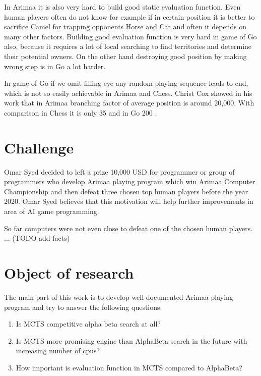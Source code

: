 In Arimaa it is also very hard to build good static evaluation function. Even
human players often do not know for example if in certain position it is better
to sacrifice Camel for trapping opponents Horse and Cat and often it depends on
many other factors. Building good evaluation function is very hard in game of
Go also, because it requires a lot of local searching to find territories and
determine their potential owners. On the other hand destroying good position by
making wrong step is in Go a lot harder.

In game of Go if we omit filling eye any random playing sequence leads to end,
which is not so easily achievable in Arimaa and Chess. Christ Cox showed in his
work that in Arimaa branching factor of average position is around 20,000. With
comparison in Chess it is only 35 and in Go 200 \cite{COX}.


\section{Challenge}
Omar Syed decided to left a prize 10,000 USD for programmer or group of
programmers who develop Arimaa playing program which win Arimaa Computer
Championship and then defeat three chosen top human players before the year
2020. Omar Syed believes that this motivation will help further improvements in
area of AI game programming\cite{syed}.

So far computers were not even close to defeat one of the chosen human
players\cite{arimaa.com}. ... (TODO add facts)

\section{Object of research}
The main part of this work is to develop well documented Arimaa playing program
and try to answer the following questions:

\begin{enumerate}
\item Is MCTS competitive alpha beta search at all?
\item Is MCTS more promising engine than AlphaBeta search in the future with
      increasing number of cpus?
\item How important is evaluation function in MCTS compared to AlphaBeta?
\end{enumerate}

